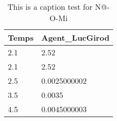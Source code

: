 \begin{table}[h]
	\caption{This is a caption test for N@-O-Mi}\label{tab:This is a label test for N@-O-Mi}
		\begin{tabular}{|l|l|}
		\hline
		Temps & Agent_LucGirod\\ \hline
		2.1 & 2.52\\ \hline
		2.1 & 2.52\\ \hline
		2.5 & 0.0025000002\\ \hline
		3.5 & 0.0035\\ \hline
		4.5 & 0.0045000003\\ \hline
		\hline
	\end{tabular}
\end{table}
